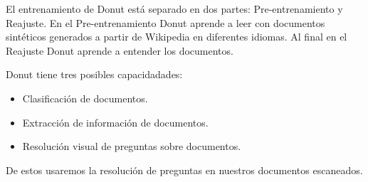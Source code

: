 \documentclass[../main.tex]{subfiles}
\begin{document}
El entrenamiento de Donut está separado en dos partes: Pre-entrenamiento y Reajuste.
En el Pre-entrenamiento Donut aprende a leer con documentos sintéticos generados a partir de Wikipedia en diferentes idiomas.
Al final en el Reajuste Donut aprende a entender los documentos.

Donut tiene tres posibles capacidadades:
\begin{itemize}
	\item Clasificación de documentos.
	\item Extracción de información de documentos.
	\item Resolución visual de preguntas sobre documentos.
\end{itemize}

De estos usaremos la resolución de preguntas en nuestros documentos escaneados.
\end{document}
